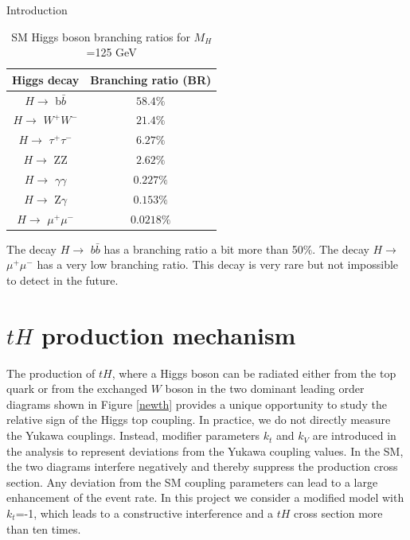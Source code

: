 \begin{chapter}{Introduction}
\begin{table}[ht] 
\caption[SM Higgs boson branching ratios for $M_H$ =125 GeV]{SM Higgs boson branching ratios for $M_H$ =125 GeV \protect \cite{pd}}
\centering
\begin{tabular}{|c|c|}
\hline
Higgs decay & Branching ratio (BR)\\
\hline
$H \rightarrow$ b$\bar{b}$ &$58.4\%$ \\
\hline
 $H \rightarrow$ $W^+W^-$ &$21.4\%$ \\
\hline
$H \rightarrow$ $\tau^+ \tau^-$ & $6.27\%$\\
\hline
$H \rightarrow$ ZZ &$2.62\%$\\
\hline
$H \rightarrow$ $\gamma\gamma$ &$0.227\%$\\
\hline
$H \rightarrow$ Z$\gamma$ &$0.153\%$\\
\hline
$H \rightarrow$ $\mu^+\mu^-$ &$0.0218\%$\\
\hline
\end{tabular}
\label{higgs1}
\end{table}
The decay $H \rightarrow$ $b\bar{b}$ has a branching ratio a bit more than 50$\%$. The decay $H \rightarrow$ $\mu^+\mu^-$ has a very low branching ratio. This decay is very rare but not impossible to detect in the future. %

\section{$tH$ production mechanism}
The production of $tH$, where a Higgs boson can be radiated
either from the top quark or from the exchanged $W$ boson in the two dominant leading order
diagrams shown in Figure \ref{newth} provides a unique opportunity to study the relative sign of the Higgs top coupling.
In practice, we do not directly measure the Yukawa couplings. Instead, modifier parameters $k_t$ and $k_V$ are introduced in the analysis to represent deviations from the Yukawa coupling values. 
In the SM, the two diagrams interfere negatively and thereby suppress the production cross section.
Any deviation from the SM coupling parameters can lead to a large enhancement of the event rate. 
In this project we consider a modified model with $k_t$=-1, which leads to a constructive interference and a $tH$ cross section more than ten times. 


\end{chapter}
